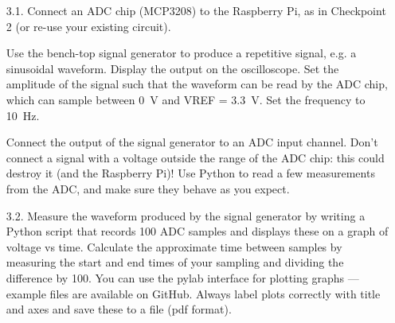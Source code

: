 \begin{enumerate}

\item [3.1.] Connect an ADC chip (MCP3208) to the Raspberry Pi, as in Checkpoint 2 (or re-use your existing circuit).

Use the bench-top signal generator to produce a repetitive signal, e.g. a sinusoidal waveform.
Display the output on the oscilloscope.
Set the amplitude of the signal such that the waveform can be read by the ADC chip, which can sample between 0~V and VREF = 3.3~V. Set the frequency to 10~Hz.

Connect the output of the signal generator to an ADC input channel.
Don't connect a signal with a voltage outside the range of the ADC chip: this could destroy it (and the Raspberry Pi)!
Use Python to read a few measurements from the ADC, and make sure they behave as you expect.


\item [3.2.] Measure the waveform produced by the signal generator by writing a Python script that records 100 ADC samples and displays these on a graph of voltage vs time.
Calculate the approximate time between samples by measuring the start and end times of your sampling and dividing the difference by 100.
You can use the pylab interface for plotting graphs --- example files are available on GitHub.
Always label plots correctly with title and axes and save these to a file (pdf format).




\end{enumerate}
